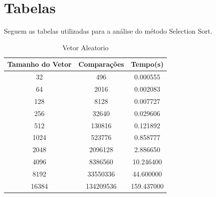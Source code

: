 \documentclass[12pt,a4paper,twoside]{report}
\begin{document}
\chapter{Tabelas}

Seguem as tabelas utilizadas para a análise do método Selection Sort.

\begin{table}[h]
  \centering
  \caption{Vetor Aleatorio \label{tab:aleatorio}}
  \begin{tabular}{ccc} \\\hline
  \textbf{Tamanho do Vetor} & \textbf{Comparações} & \textbf{Tempo(s)} \\\hline
  32                        & 496                  & 0.000555          \\\hline
  64                        & 2016                 & 0.002083          \\\hline
  128                       & 8128                 & 0.007727          \\\hline
  256                       & 32640                & 0.029606          \\\hline
  512                       & 130816               & 0.121892          \\\hline
  1024                      & 523776               & 0.858777          \\\hline
  2048                      & 2096128              & 2.886650          \\\hline
  4096                      & 8386560              & 10.246400         \\\hline
  8192                      & 33550336             & 44.600000         \\\hline
  16384                     & 134209536            & 159.437000       \\\hline
  \end{tabular}
\end{table}
\end{document}
